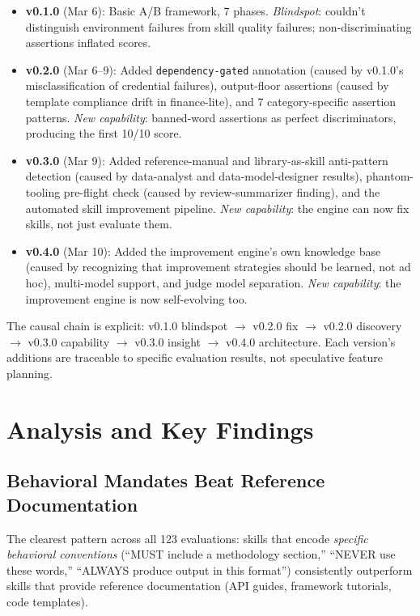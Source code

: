 \documentclass[11pt,a4paper]{article}
\begin{document}
\begin{itemize}[leftmargin=*]
    \item \textbf{v0.1.0} (Mar 6): Basic A/B framework, 7 phases. \emph{Blindspot}: couldn't distinguish environment failures from skill quality failures; non-discriminating assertions inflated scores.
    \item \textbf{v0.2.0} (Mar 6--9): Added \texttt{dependency-gated} annotation (caused by v0.1.0's misclassification of credential failures), output-floor assertions (caused by template compliance drift in finance-lite), and 7 category-specific assertion patterns. \emph{New capability}: banned-word assertions as perfect discriminators, producing the first 10/10 score.
    \item \textbf{v0.3.0} (Mar 9): Added reference-manual and library-as-skill anti-pattern detection (caused by data-analyst and data-model-designer results), phantom-tooling pre-flight check (caused by review-summarizer finding), and the automated skill improvement pipeline. \emph{New capability}: the engine can now fix skills, not just evaluate them.
    \item \textbf{v0.4.0} (Mar 10): Added the improvement engine's own knowledge base (caused by recognizing that improvement strategies should be learned, not ad hoc), multi-model support, and judge model separation. \emph{New capability}: the improvement engine is now self-evolving too.
\end{itemize}

The causal chain is explicit: v0.1.0 blindspot $\rightarrow$ v0.2.0 fix $\rightarrow$ v0.2.0 discovery $\rightarrow$ v0.3.0 capability $\rightarrow$ v0.3.0 insight $\rightarrow$ v0.4.0 architecture. Each version's additions are traceable to specific evaluation results, not speculative feature planning.

\section{Analysis and Key Findings}
\label{sec:analysis}

\subsection{Behavioral Mandates Beat Reference Documentation}

The clearest pattern across all 123 evaluations: skills that encode \emph{specific behavioral conventions} (``MUST include a methodology section,'' ``NEVER use these words,'' ``ALWAYS produce output in this format'') consistently outperform skills that provide reference documentation (API guides, framework tutorials, code templates).
\end{document}
